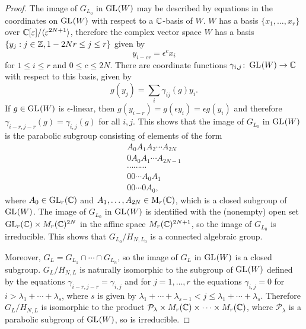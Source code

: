 \documentclass[a4paper, 11pt]{report}
\begin{document}
\begin{proof}
The image of $G_{L_0}$ in $\operatorname{GL}_{}(W)$ may be described by equations in the coordinates on $\operatorname{GL}_{}(W)$ with respect to a $\mathbb{C}$-basis of $W$. $W$ has a basis $\{x_1,\ldots,x_r\}$ over $\mathbb{C}[\varepsilon]/{\langle\varepsilon^{2N+1}\rangle}$, therefore the complex vector space $W$ has a basis $\{y_j:j\in\mathbb{Z},1-2Nr\le j\le r\}$ given by
\begin{equation*}
y_{i-cr} = \epsilon^c x_i
\end{equation*}
for $1\le i\le r$ and $0\le c\le 2N$. There are coordinate functions $\gamma_{i,j}\colon\operatorname{GL}_{}(W)\to\mathbb{C}$ with respect to this basis, given by
\begin{equation*}
g(y_j) = \sum_i \gamma_{ij}(g)y_i.
\end{equation*}
If $g\in\operatorname{GL}_{}(W)$ is $\epsilon$-linear, then $g(y_{i-r}) = g(\epsilon y_i) = \epsilon g(y_i)$ and therefore $\gamma_{i-r,j-r}(g) = \gamma_{i,j}(g)$ for all $i,j$. This shows that the image of $G_{L_0}$ in $\operatorname{GL}_{}(W)$ is the parabolic subgroup consisting of elements of the form
\begin{align*}
A_0 A_1 A_2 \cdots A_{2N}\\
0 A_0 A_1 \cdots A_{2N-1}\\
\cdots \cdots \cdots\\
0 0 \cdots A_0 A_1\\
0 0 \cdots 0 A_0,
\end{align*}
where $A_0\in\operatorname{GL}_{r}(\mathbb{C})$ and $A_1,\ldots,A_{2N}\in\operatorname{M}_{r}(\mathbb{C})$, which is a closed subgroup of $\operatorname{GL}_{}(W)$. The image of $G_{L_0}$ in $\operatorname{GL}_{}(W)$ is identified with the (nonempty) open set $\operatorname{GL}_{r}(\mathbb{C})\times M_r(\mathbb{C})^{2N}$ in the affine space $M_r(\mathbb{C})^{2N+1}$, so the image of $G_{L_0}$ is irreducible. This shows that $G_{L_0}/{H_{N,L_0}}$ is a connected algebraic group.

Moreover, $G_L = G_{L_1}\cap\cdots\cap G_{L_n}$, so the image of $G_L$ in $\operatorname{GL}_{}(W)$ is a closed subgroup. $G_L/{H_{N,L}}$ is naturally isomorphic to the subgroup of $\operatorname{GL}_{}(W)$ defined by the equations $\gamma_{i-r,j-r} = \gamma_{i,j}$ and for $j=1,\ldots,r$ the equations $\gamma_{i,j}=0$ for $i>\lambda_1+\cdots +\lambda_s$, where $s$ is given by $\lambda_1+\cdots +\lambda_{s-1}< j\le\lambda_1+\cdots +\lambda_s$. Therefore $G_L/{H_{N,L}}$ is isomorphic to the product $\mathcal{P}_\lambda\times M_r(\mathbb{C})\times\cdots\times M_r(\mathbb{C})$, where $\mathcal{P}_\lambda$ is a parabolic subgroup of $\operatorname{GL}_{}(W)$, so is irreducible.
\end{proof}
\end{document}

